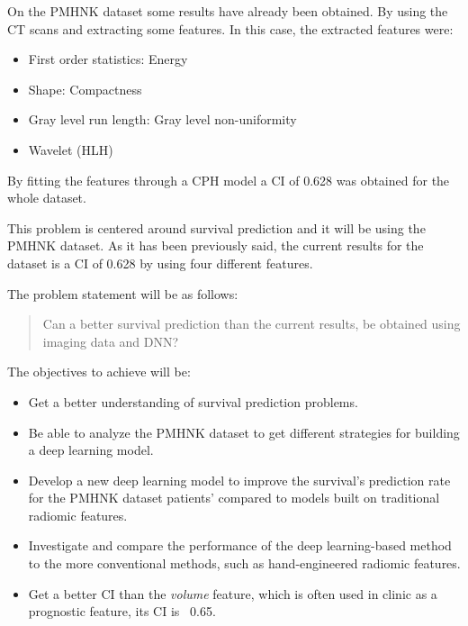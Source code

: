 On the \gls{PMHNK} dataset some results have already been obtained. By using the \gls{CT} scans and
extracting some features. In this case, the extracted features were:
\begin{itemize}
  \item First order statistics: Energy
  \item Shape: Compactness
  \item Gray level run length: Gray level non-uniformity
  \item Wavelet (HLH) 
\end{itemize}
By fitting the features through a \gls{CPH} model a \gls{CI} of 0.628 was obtained for the whole
dataset.
~\cite{medical:ct-based-radiomic-signature}


This problem is centered around survival prediction and it will be using the \gls{PMHNK} dataset. 
As it has been previously said, the current results for the dataset is a \gls{CI}
of 0.628 \cite{medical:ct-based-radiomic-signature} by using four different features.

The problem statement will be as follows:
\begin{quotation}
  Can a better survival prediction than the current results, be obtained using imaging data and
  \gls{DNN}?
\end{quotation}


The objectives to achieve will be:
\begin{itemize}
  \item Get a better understanding of survival prediction problems.
  \item Be able to analyze the \gls{PMHNK} dataset to get different strategies for building a 
  deep learning model.
  \item Develop a new deep learning model to improve the survival's prediction rate for the
  \gls{PMHNK} dataset patients' compared to models built on traditional radiomic features.
  \item Investigate and compare the performance of the deep learning-based method to 
  the more conventional methods, such as hand-engineered radiomic features.
  \item Get a better \gls{CI} than the \emph{volume} feature, which is often used in clinic as a
  prognostic feature, its \gls{CI} is ~0.65.
\end{itemize}


